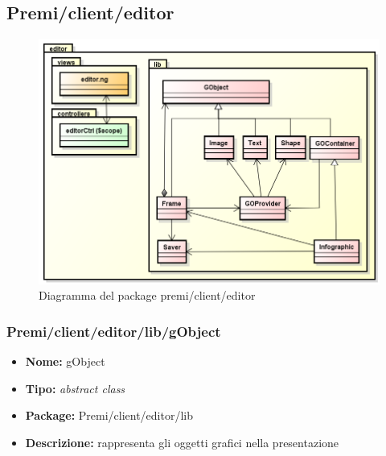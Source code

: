 \subsection{Premi/client/editor}
\begin{figure}[!h]
\begin{center}
\includegraphics[scale=0.45]{img/diapkg/editor.png}
\caption{Diagramma del package premi/client/editor}
\end{center}
\end{figure}
\subsubsection{Premi/client/editor/lib/gObject}
\begin{itemize}
  \item[] \textbf{Nome:} gObject
  \item[] \textbf{Tipo:} \textit{abstract class}
  \item[] \textbf{Package:} Premi/client/editor/lib
  \item[] \textbf{Descrizione:} rappresenta gli oggetti grafici nella presentazione
\end{itemize}
